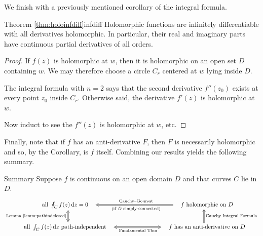 We finish with a previously mentioned corollary of the integral formula.

\begin{cor}{Theorem \ref{thm:holoinfdiff}}{infdiff}
	Holomorphic functions are infinitely differentiable with all derivatives holomorphic. In particular, their real and imaginary parts have continuous partial derivatives of all orders.
\end{cor}


\begin{proof}
	If $f(z)$ is holomorphic at $w$, then it is holomorphic on an open set $D$ containing $w$. We may therefore choose a circle $C_r$ centered at $w$ lying inside $D$.\par
	The integral formula with $n=2$ says that the second derivative $f''(z_0)$ exists at every point $z_0$ inside $C_r$. Otherwise said, the derivative $f'(z)$ is holomorphic at $w$.\par
	Now induct to see the $f''(z)$ is holomorphic at $w$, etc.
\end{proof}

\goodbreak

Finally, note that if $f$ has an anti-derivative $F$, then $F$ is necessarily holomorphic and so, by the Corollary, is $f$ itself. Combining our results yields the following summary.

\begin{thm*}{Summary}
	Suppose $f$ is continuous on an open domain $D$ and that curves $C$ lie in $D$.
	\[
		\xymatrix @R20pt @C80pt{%
			\text{all}\ \oint_C f(z)\,\dz=0\quad \ar@{<=>}[d]_{\text{Lemma \ref*{lemm:pathindclosed}}}  & \quad f\ \text{holomorphic on $D$} \ar@{=>}[l]_{\text{Cauchy--Goursat}}^{\text{(if $D$ simply-connected)}}\\
			\text{all}\ \int_C f(z)\,\dz\ \text{path-independent} \quad \ar@{<=>}[r]_{\ \ \text{Fundamental Thm}} & \quad f\ \text{has an anti-derivative on $D$} \ar@{=>}[u]_{\text{Cauchy Integral Formula}} 
		}
	\]
\end{thm*}




 



